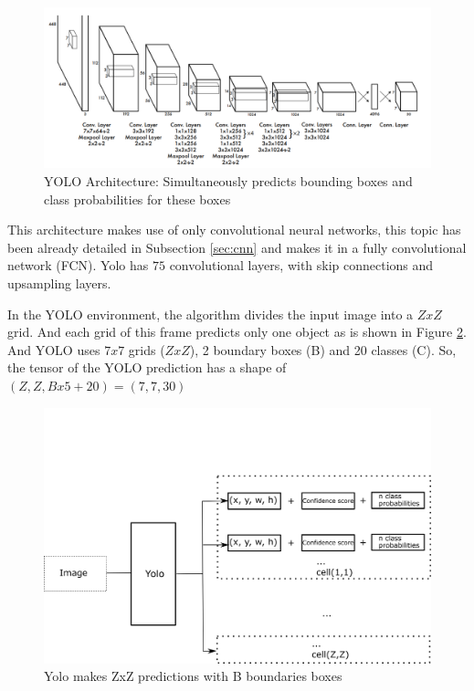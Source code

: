 \begin{figure}[H]
\centering
\includegraphics[width=\textwidth]{imagens/yolo.png}
\caption{YOLO Architecture: Simultaneously predicts bounding boxes and class probabilities for these boxes \cite{redmon2016you}}
\label{fig:yolo_arc}
\end{figure}

This architecture makes use of only convolutional neural networks, this topic has been already detailed in Subsection \ref{sec:cnn} and makes it in a fully convolutional network (FCN). Yolo has $75$ convolutional layers, with skip connections and upsampling layers.  





In the YOLO environment, the algorithm divides the input image into a $ZxZ$ grid. And each grid of this frame predicts only one object as is shown in Figure \ref{fig:yolo_flow}. And YOLO uses $7x7$ grids ($ZxZ$), 2 boundary boxes (B) and 20 classes (C). So, the tensor of the YOLO prediction has a shape of $(Z,Z, Bx5+20) = (7,7,30)$


\begin{figure}[H]
\centering
\includegraphics[width=\textwidth]{imagens/yolo_flow.png}
\caption{Yolo makes ZxZ predictions with B boundaries boxes}
\label{fig:yolo_flow}
\end{figure}

